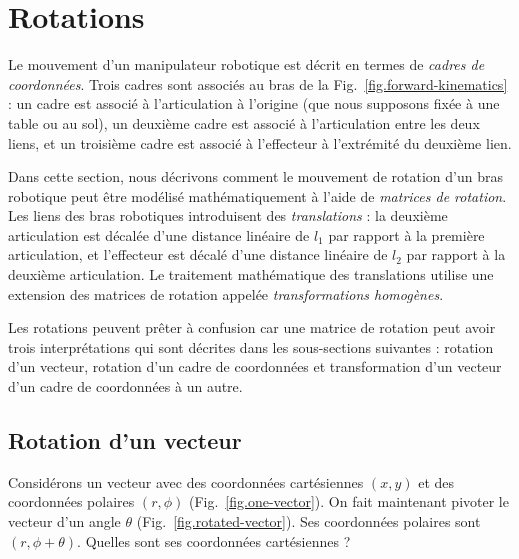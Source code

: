 
\section{Rotations}\label{s.rotations}

Le mouvement d'un manipulateur robotique est décrit en termes de \emph{cadres de coordonnées}. Trois cadres sont associés au bras de la Fig.~\ref{fig.forward-kinematics} : un cadre est associé à l'articulation à l'origine (que nous supposons fixée à une table ou au sol), un deuxième cadre est associé à l'articulation entre les deux liens, et un troisième cadre est associé à l'effecteur à l'extrémité du deuxième lien.

Dans cette section, nous décrivons comment le mouvement de rotation d'un bras robotique peut être modélisé mathématiquement à l'aide de \emph{matrices de rotation}. Les liens des bras robotiques introduisent des \emph{translations} : la deuxième articulation est décalée d'une distance linéaire de $l_1$ par rapport à la première articulation, et l'effecteur est décalé d'une distance linéaire de $l_2$ par rapport à la deuxième articulation. Le traitement mathématique des translations utilise une extension des matrices de rotation appelée \emph{transformations homogènes}.

Les rotations peuvent prêter à confusion car une matrice de rotation peut avoir trois interprétations qui sont décrites dans les sous-sections suivantes : rotation d'un vecteur, rotation d'un cadre de coordonnées et transformation d'un vecteur d'un cadre de coordonnées à un autre.

\subsection{Rotation d'un vecteur}

Considérons un vecteur avec des coordonnées cartésiennes $(x,y)$ et des coordonnées polaires $(r,\phi)$ (Fig.~\ref{fig.one-vector}). On fait maintenant pivoter le vecteur d'un angle $\theta$ (Fig.~\ref{fig.rotated-vector}). Ses coordonnées polaires sont $(r,\phi+\theta)$. Quelles sont ses coordonnées cartésiennes ?

